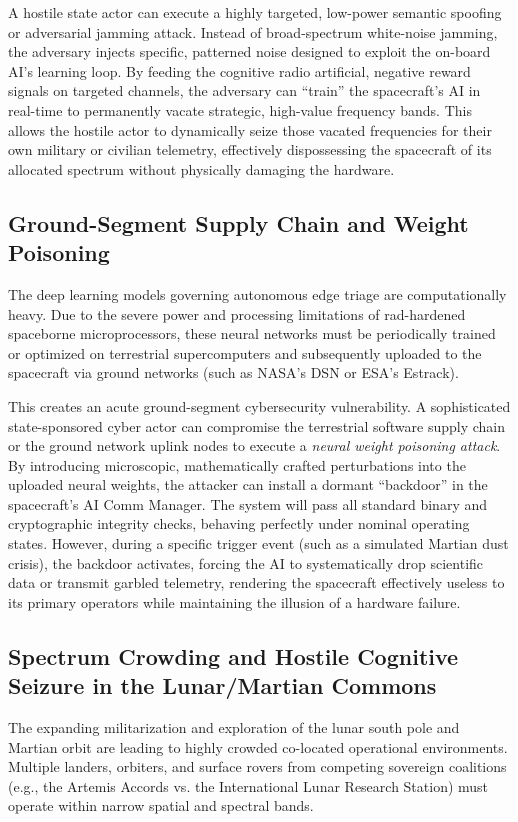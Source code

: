 \documentclass[final,5p,times,twocolumn]{elsarticle}
\begin{document}
A hostile state actor can execute a highly targeted, low-power semantic spoofing or adversarial jamming attack. Instead of broad-spectrum white-noise jamming, the adversary injects specific, patterned noise designed to exploit the on-board AI's learning loop. By feeding the cognitive radio artificial, negative reward signals on targeted channels, the adversary can ``train'' the spacecraft's AI in real-time to permanently vacate strategic, high-value frequency bands. This allows the hostile actor to dynamically seize those vacated frequencies for their own military or civilian telemetry, effectively dispossessing the spacecraft of its allocated spectrum without physically damaging the hardware.

\subsection{Ground-Segment Supply Chain and Weight Poisoning}
The deep learning models governing autonomous edge triage are computationally heavy. Due to the severe power and processing limitations of rad-hardened spaceborne microprocessors, these neural networks must be periodically trained or optimized on terrestrial supercomputers and subsequently uploaded to the spacecraft via ground networks (such as NASA's DSN or ESA's Estrack).

This creates an acute ground-segment cybersecurity vulnerability. A sophisticated state-sponsored cyber actor can compromise the terrestrial software supply chain or the ground network uplink nodes to execute a \textit{neural weight poisoning attack}. By introducing microscopic, mathematically crafted perturbations into the uploaded neural weights, the attacker can install a dormant ``backdoor'' in the spacecraft's AI Comm Manager. The system will pass all standard binary and cryptographic integrity checks, behaving perfectly under nominal operating states. However, during a specific trigger event (such as a simulated Martian dust crisis), the backdoor activates, forcing the AI to systematically drop scientific data or transmit garbled telemetry, rendering the spacecraft effectively useless to its primary operators while maintaining the illusion of a hardware failure.

\subsection{Spectrum Crowding and Hostile Cognitive Seizure in the Lunar/Martian Commons}
The expanding militarization and exploration of the lunar south pole and Martian orbit are leading to highly crowded co-located operational environments. Multiple landers, orbiters, and surface rovers from competing sovereign coalitions (e.g., the Artemis Accords vs. the International Lunar Research Station) must operate within narrow spatial and spectral bands.
\end{document}
